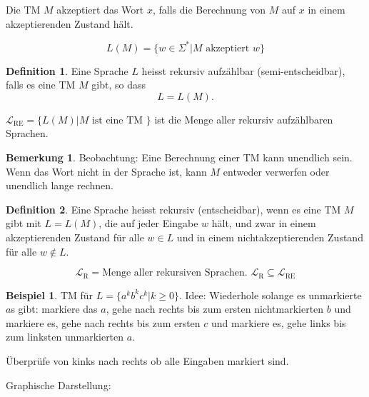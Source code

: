 \documentclass[11pt]{article} %
\theoremstyle{definition}
\newtheorem*{beispiel}{Beispiel}
\newtheorem{definition}{Definition}
\newtheorem*{bemerkung}{Bemerkung}
\begin{document}
Die TM $M$ akzeptiert das Wort $x$, falls die Berechnung von $M$ auf $x$ in einem akzeptierenden Zustand hält.

\[
L(M) = \{w \in \Sigma^* | M \textrm{ akzeptiert } w \}
\]


\begin{definition}
Eine Sprache $L$ heisst rekursiv aufzählbar (semi-entscheidbar), falls es eine TM $M$ gibt, so dass
\[
L = L(M).
\]

$\mathcal{L}_{\textrm{RE}} = \{L(M) | M \textrm{ ist eine TM } \}$ ist die Menge aller rekursiv aufzählbaren Sprachen.

\end{definition}

\begin{bemerkung}
Beobachtung: Eine Berechnung einer TM kann unendlich sein. Wenn das Wort nicht in der Sprache ist, kann $M$ entweder verwerfen oder unendlich lange rechnen.
\end{bemerkung}

\begin{definition}
Eine Sprache heisst rekursiv (entscheidbar), wenn es eine TM $M$ gibt mit $L= L(M)$, die auf jeder Eingabe $w$ hält, und zwar in einem akzeptierenden Zustand für alle $w \in L$ und in einem nichtakzeptierenden Zustand für alle $w \notin L$.

\[
\mathcal{L}_\textrm{R} = \textrm{Menge aller rekursiven Sprachen. } \mathcal{L}_\textrm{R} \subseteq \mathcal{L}_\textrm{RE}
\]
\end{definition}

\begin{beispiel} TM für $L = \{a^kb^kc^k | k \ge 0\}$. Idee: Wiederhole solange  es unmarkierte $a$s gibt: markiere das $a$, gehe nach rechts bis zum ersten nichtmarkierten $b$ und markiere es, gehe nach rechts bis zum ersten $c$ und markiere es, gehe links bis zum linksten unmarkierten $a$.

Überprüfe von kinks nach rechts ob alle Eingaben markiert sind.

\end{beispiel}

Graphische Darstellung:
\end{document}
